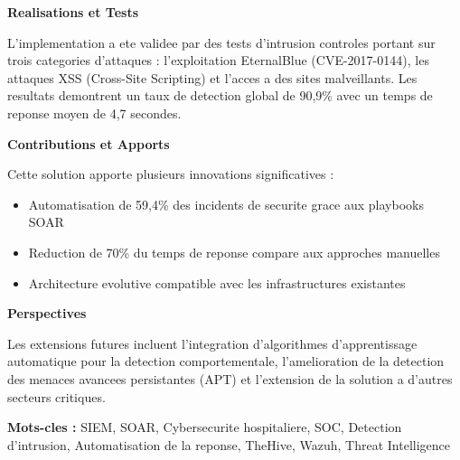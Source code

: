 \vspace{0.5cm}
\clearpage

\textbf{Realisations et Tests}

L'implementation a ete validee par des tests d'intrusion controles portant sur trois categories d'attaques : l'exploitation EternalBlue (CVE-2017-0144), les attaques XSS (Cross-Site Scripting) et l'acces a des sites malveillants. Les resultats demontrent un taux de detection global de 90,9\% avec un temps de reponse moyen de 4,7 secondes.

\vspace{0.5cm}

\textbf{Contributions et Apports}

Cette solution apporte plusieurs innovations significatives :
\begin{itemize}
    \item Automatisation de 59,4\% des incidents de securite grace aux playbooks SOAR
    \item Reduction de 70\% du temps de reponse compare aux approches manuelles
    \item Architecture evolutive compatible avec les infrastructures existantes
\end{itemize}

\vspace{0.5cm}

\textbf{Perspectives}

Les extensions futures incluent l'integration d'algorithmes d'apprentissage automatique pour la detection comportementale, l'amelioration de la detection des menaces avancees persistantes (APT) et l'extension de la solution a d'autres secteurs critiques.

\vspace{1cm}

\textbf{Mots-cles :} SIEM, SOAR, Cybersecurite hospitaliere, SOC, Detection d'intrusion, Automatisation de la reponse, TheHive, Wazuh, Threat Intelligence

\newpage
